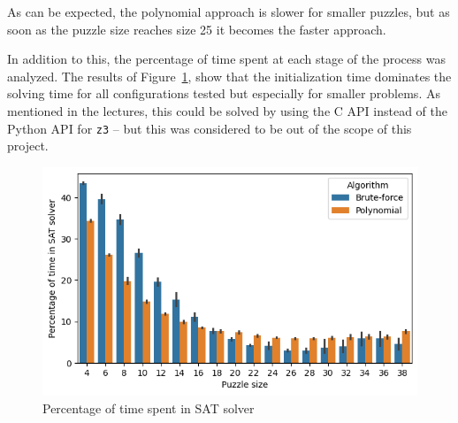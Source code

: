 \documentclass[12pt]{article}
\begin{document}
As can be expected, the polynomial approach is slower for smaller puzzles, but as soon as the puzzle size reaches size 25 it becomes the faster approach.

In addition to this, the percentage of time spent at each stage of the process was analyzed.
The results of Figure~\ref{fig:util}, show that the initialization time dominates the solving time for all configurations tested but especially for smaller problems.
As mentioned in the lectures, this could be solved by using the C API instead of the Python API for \texttt{z3} -- but this was considered to be out of the scope of this project.

\begin{figure}[H]
  \includegraphics[scale=0.5]{util.png}
  \centering
  \caption{Percentage of time spent in SAT solver}
  \label{fig:util}
\end{figure}
\end{document}
